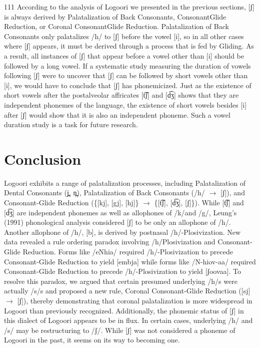 \documentclass[output=paper]{langsci/langscibook}
\begin{document}
\begin{tabular}{111}
According to the analysis of Logoori we presented in the previous sections, [ʃ] is always derived by Palatalization of Back Consonants, ConsonantGlide Reduction, or Coronal ConsonantGlide Reduction. Palatalization of Back Consonants only palatalizes /h/ to [ʃ] before the vowel [i], so in all other cases where [ʃ] appears, it must be derived through a process that is fed by Gliding. As a result, all instances of [ʃ] that appear before a vowel other than [i] should be followed by a long vowel. If a systematic study measuring the duration of vowels following [ʃ] were to uncover that [ʃ] can be followed by short vowels other than [i], we would have to conclude that [ʃ] has phonemicized. Just as the existence of short vowels after the postalveolar affricates [t͡ʃ] and [d͡ʒ] shows that they are independent phonemes of the language, the existence of short vowels besides [i] after [ʃ] would show that it is also an independent phoneme. Such a vowel duration study is a task for future research.

\section{Conclusion}

Logoori exhibits a range of palatalization processes, including Palatalization of Dental Consonants (j̪, n̪), Palatalization of Back Consonants (/h/ $\rightarrow$ [ʃ]), and Consonant-Glide Reduction (\{[kj], [gj], [hj]\} $\rightarrow$ \{[t͡ʃ], [d͡ʒ], [ʃ]\}). While [t͡ʃ] and [d͡ʒ] are independent phonemes as well as allophones of /k/and /g/, Leung’s (1991) phonological analysis considered [ʃ] to be only an allophone of /h/. Another allophone of /h/, [b], is derived by postnasal /h/-Plosivization. New data revealed a rule ordering paradox involving /h/Plosivization and Consonant-Glide Reduction. Forms like /eNhia/ required /h/-Plosivization to precede Consonant-Glide Reduction to yield [embja] while forms like /N-hiov-aa/ required Consonant-Glide Reduction to precede /h/-Plosivization to yield [ʃoovaa]. To resolve this paradox, we argued that certain presumed underlying /h/s were actually /s/s and proposed a new rule, Coronal Consonant-Glide Reduction ([sj] $\rightarrow$ [ʃ]), thereby demonstrating that coronal palatalization is more widespread in Logoori than previously recognized. Additionally, the phonemic status of [ʃ] in this dialect of Logoori appears to be in flux. In certain cases, underlying /h/ and /s/ may be restructuring to /ʃ/. While [ʃ] was not considered a phoneme of Logoori in the past, it seems on its way to becoming one.


\end{tabular}
\end{document}
